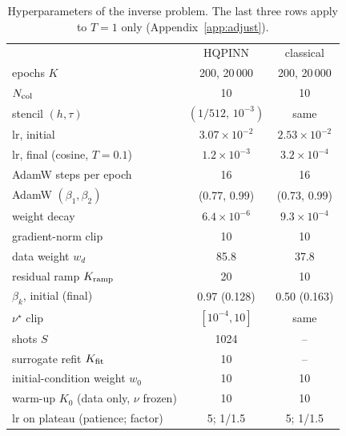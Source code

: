 \documentclass[floatfix,aps,pra,twocolumn,superscriptaddress,10pt,nofootinbib]{revtex4-2}
\newcommand{\Ncol}{N_{\rm col}}
\begin{document}
\begin{appendices}
\begin{table}[h]
\caption{\justifying Hyperparameters of the inverse problem. The last three rows apply to $T=1$ only (Appendix~\ref{app:adjust}).}
\label{tab:hyper_inv}
\setlength{\tabcolsep}{2pt}
\footnotesize
\begin{ruledtabular}
\begin{tabular}{lcc}
 & HQPINN & classical\\
\colrule
epochs $K$ & 200, 20\,000 & 200, 20\,000\\
$\Ncol$ & 10 & 10\\
stencil $(h,\tau)$ & $(1/512,\,10^{-3})$ & same\\
lr, initial & $3.07\times10^{-2}$ & $2.53\times10^{-2}$\\
lr, final (cosine, $T=0.1$) & $1.2\times10^{-3}$ & $3.2\times10^{-4}$\\
AdamW steps per epoch & 16 & 16\\
AdamW $(\beta_1,\beta_2)$ & (0.77, 0.99) & (0.73, 0.99)\\
weight decay & $6.4\times10^{-6}$ & $9.3\times10^{-4}$\\
gradient-norm clip & 10 & 10\\
data weight $w_d$ & 85.8 & 37.8\\
residual ramp $K_{\rm ramp}$ & 20 & 10\\
$\beta_k$, initial (final) & 0.97 (0.128) & 0.50 (0.163)\\
$\nu^\star$ clip & $[10^{-4},10]$ & same\\
shots $S$ & 1024 & --\\
surrogate refit $K_{\rm fit}$ & 10 & --\\
\colrule
initial-condition weight $w_0$ & 10 & 10\\
warm-up $K_0$ (data only, $\nu$ frozen) & 10 & 10\\
lr on plateau (patience; factor) & 5; 1/1.5 & 5; 1/1.5\\
\end{tabular}
\end{ruledtabular}
\end{table}


\end{appendices}
\end{document}

